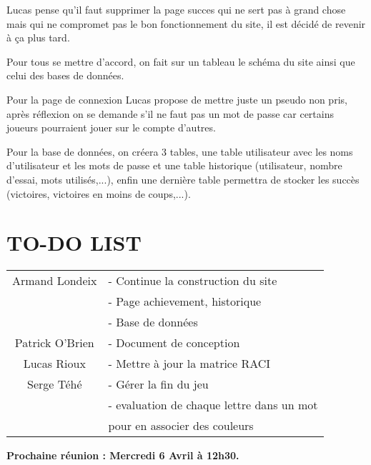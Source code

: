 \tabto{1cm}Lucas pense qu’il faut supprimer la page succes qui ne sert pas à grand chose mais qui ne compromet pas le bon fonctionnement du site, il est décidé de revenir à ça plus tard.

\tabto{1cm}Pour tous se mettre d’accord, on fait sur un tableau le schéma du site ainsi que celui des bases de données.

\tabto{1cm}Pour la page de connexion Lucas propose de mettre juste un pseudo non pris, après réflexion on se demande s’il ne faut pas un mot de passe car certains joueurs pourraient jouer sur le compte d’autres.

\tabto{1cm}Pour la base de données, on créera 3 tables, une table utilisateur avec les noms d’utilisateur et les mots de passe et une table historique (utilisateur, nombre d'essai, mots utilisés,...), enfin une dernière table permettra de stocker les succès (victoires, victoires en moins de coups,...).

\section*{TO-DO LIST}

\begin{center}
\begin{tabular}{|c|l|}
    \hline
    Armand Londeix & - Continue la construction du site \\
    & - Page achievement, historique \\
    & - Base de données \\
    \hline
    Patrick O'Brien & - Document de conception \\ 
   \hline
    Lucas Rioux & - Mettre à jour la matrice RACI \\
    \hline
    Serge Téhé & - Gérer la fin du jeu \\
    & - evaluation de chaque lettre dans un mot \\
    & pour en associer des couleurs \\
    \hline
\end{tabular}
\end{center}

\tabto{0cm}\textbf{Prochaine réunion : Mercredi 6 Avril à 12h30.}